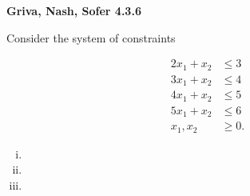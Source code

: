 \textbf{Griva, Nash, Sofer 4.3.6}

Consider the system of constraints

\begin{align*}
  2x_1 + x_2 &\leq 3 \\
  3x_1 + x_2 &\leq 4 \\
  4x_1 + x_2 &\leq 5 \\
  5x_1 + x_2 &\leq 6 \\
    x_1, x_2 &\geq 0.
\end{align*}

\begin{enumerate}[(i)]
  \item 
  \pagebreak
  \item 
  \pagebreak
  \item 
\end{enumerate}